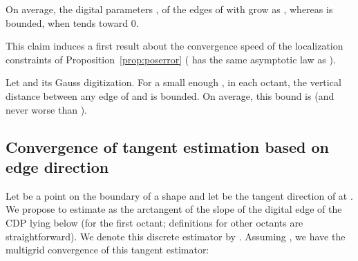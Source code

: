 \documentclass{llncs}
\newcommand{\refProposition}[1]{Proposition~\ref{#1}}
\begin{document}
\begin{myclaim} \label{claim:asymptotic-pqdelta}
  On average, the digital parameters ,  of the edges of
   with  grow as ,
  whereas  is bounded, when  tends toward 0.
\end{myclaim}

This claim induces a first result about the convergence speed of the
localization constraints of \refProposition{prop:poserror}
( has the same asymptotic law as ).

\begin{proposition} \label{prop:poserrorcv} 
  Let  and  its Gauss digitization. For a
  small enough , in each octant, the vertical distance between any
  edge of  and  is bounded. On average, this
  bound is  (and never worse than
  ).
\end{proposition}

\subsection{Convergence of tangent estimation based on edge direction}

Let  be a point on the boundary of a shape  and let
 be the tangent direction of  at . We
propose to estimate  as the arctangent of the slope of
the digital edge of the CDP  lying below  (for the
first octant; definitions for other octants are straightforward). We
denote this discrete estimator by . Assuming
, we have the multigrid convergence
of this tangent estimator:
\end{document}
